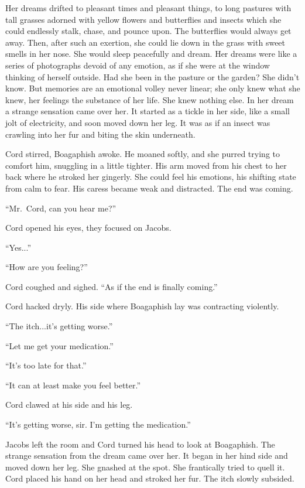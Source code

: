 Her dreams drifted to pleasant times and pleasant things, to long
pastures with tall grasses adorned with yellow flowers and butterflies
and insects which she could endlessly stalk, chase, and pounce upon. The
butterflies would always get away. Then, after such an exertion, she
could lie down in the grass with sweet smells in her nose. She would
sleep peacefully and dream. Her dreams were like a series of photographs
devoid of any emotion, as if she were at the window thinking of herself
outside. Had she been in the pasture or the garden? She didn't know. But
memories are an emotional volley never linear; she only knew what she
knew, her feelings the substance of her life. She knew nothing else. In
her dream a strange sensation came over her. It started as a tickle in
her side, like a small jolt of electricity, and soon moved down her leg.
It was as if an insect was crawling into her fur and biting the skin
underneath.

Cord stirred, Boagaphish awoke. He moaned softly, and she purred trying
to comfort him, snuggling in a little tighter. His arm moved from his
chest to her back where he stroked her gingerly. She could feel his
emotions, his shifting state from calm to fear. His caress became weak
and distracted. The end was coming.

``Mr.~Cord, can you hear me?''

Cord opened his eyes, they focused on Jacobs.

``Yes...''

``How are you feeling?''

Cord coughed and sighed. ``As if the end is finally coming.''

Cord hacked dryly. His side where Boagaphish lay was contracting
violently.

``The itch...it's getting worse.''

``Let me get your medication.''

``It's too late for that.''

``It can at least make you feel better.''

Cord clawed at his side and his leg.

``It's getting worse, sir. I'm getting the medication.''

Jacobs left the room and Cord turned his head to look at Boagaphish. The
strange sensation from the dream came over her. It began in her hind
side and moved down her leg. She gnashed at the spot. She frantically
tried to quell it. Cord placed his hand on her head and stroked her fur.
The itch slowly subsided.

